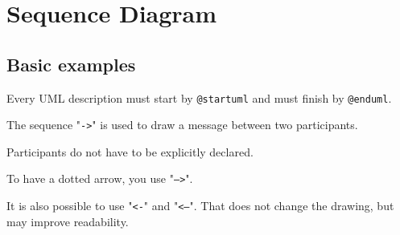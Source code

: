 %
%
% 
%
%
%
%
%
% 

\section{Sequence Diagram}

\subsection{Basic examples}

\begin{description}
\item
Every UML description must start by \texttt{@startuml} and must finish by \texttt{@enduml}.

\item
The sequence "\texttt{->}" is used to draw a message between two participants.

\item
Participants do not have to  be explicitly declared.

\item
To have a dotted arrow, you use "\texttt{-->}".

\item
It is also possible to use "\texttt{<-}" and "\texttt{<--}". That does not
change the drawing, but may improve readability.
\end{description}

